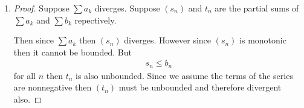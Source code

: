\begin{enumerate}[label=(\alph*)]
\begin{enumerate}[label=(\roman*)]
        \item 
        \begin{proof}
            Suppose $\sum a_k$ diverges. Suppose $(s_n)$ and
            $t_n$ are the partial sums of $\sum a_k$ and $\sum b_k$
            repectively.

            Then since $\sum a_k$ then $(s_n)$ diverges. However since
            $(s_n)$ is monotonic then it cannot be bounded. But 
            \begin{align*}
                s_n \leq b_n
            \end{align*}
            for all $n$ then $t_n$ is also unbounded. Since we assume the 
            terms of the series are nonnegative then $(t_n)$ 
            must be unbounded and therefore divergent also.
        \end{proof}
    \end{enumerate}
\end{enumerate}


